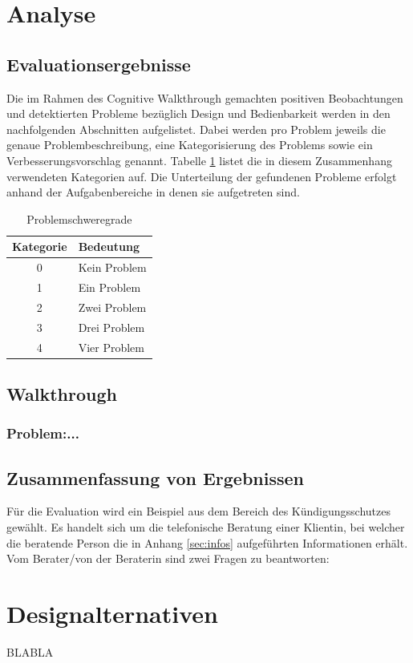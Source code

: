 \documentclass[fontsize=12pt,a4paper]{scrartcl}
\begin{document}

\section{Analyse}
\subsection{Evaluationsergebnisse}
Die im Rahmen des Cognitive Walkthrough gemachten positiven Beobachtungen und detektierten Probleme bezüglich Design und Bedienbarkeit werden in den nachfolgenden Abschnitten aufgelistet.
Dabei werden pro Problem jeweils die genaue Problembeschreibung, eine Kategorisierung des Problems sowie ein Verbesserungsvorschlag genannt.
Tabelle \ref{tbl:schwere} listet die in diesem Zusammenhang verwendeten Kategorien auf. 
Die Unterteilung der gefundenen Probleme erfolgt anhand der Aufgabenbereiche in denen sie aufgetreten sind. 

\begin{table}
	\centering\begin{tabular}{|c|l|}
		\hline
		\textbf{Kategorie} & \textbf{Bedeutung} \\
		\hline
		0 & Kein Problem \\
		1 & Ein Problem \\
		2 & Zwei Problem \\
		3 & Drei Problem \\
		4 & Vier Problem \\
		\hline
	\end{tabular}
	\caption{Problemschweregrade\label{tbl:schwere}}
\end{table}


\subsection{Walkthrough}
\subsubsection{Problem:...}

\subsection{Zusammenfassung von Ergebnissen}
Für die Evaluation wird ein Beispiel aus dem Bereich des Kündigungsschutzes gewählt. Es handelt sich um die telefonische Beratung einer Klientin, bei welcher die beratende Person die in Anhang \ref{sec:infos} aufgeführten Informationen erhält. Vom Berater/von der Beraterin sind zwei Fragen zu beantworten:


\section{Designalternativen}
BLABLA
\end{document}
